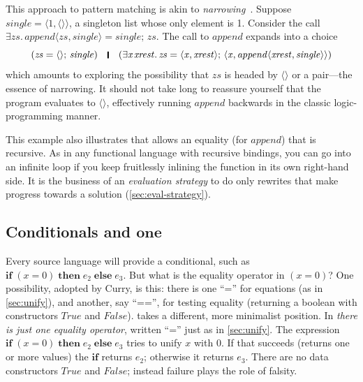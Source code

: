\documentclass[acmsmall,review,anonymous,dvipsnames]{acmart}
\newcommand{\Conid}[1]{\mathit{#1}}
\newcommand{\Varid}[1]{\mathit{#1}}
\begin{document}
This approach to pattern matching is akin to \emph{narrowing}~\cite{hanus:survey}.
Suppose \ensuremath{\Varid{single}\mathrel{=}\langle{}\mathrm{1},\langle\rangle\rangle}, a singleton list whose only element is 1.
Consider the call \ensuremath{\exists\Varid{zs}.\,\Varid{append}\langle\Varid{zs},\Varid{single}\rangle\mathrel{=}\Varid{single};\,\Varid{zs}}.
The call to \ensuremath{\Varid{append}} expands into a choice
$$
  \ensuremath{(\Varid{zs}\mathrel{=}\langle\rangle;\,\Varid{single})} \quad \ensuremath{\rule[-0.3mm]{0.5mm}{2.5mm}} \quad
  \ensuremath{(\exists\Varid{x}\hspace{0.3mm}\Varid{xrest}.\,\Varid{zs}\mathrel{=}\langle{}\Varid{x},\Varid{xrest}\rangle;\,\langle{}\Varid{x},\Varid{append}\langle\Varid{xrest},\Varid{single}\rangle\rangle)}
$$
which amounts to exploring the possibility that \ensuremath{\Varid{zs}} is headed by \ensuremath{\langle\rangle} or a pair---the
essence of narrowing.  It should not take long to reassure yourself that the program
evaluates to \ensuremath{\langle\rangle}, effectively running \ensuremath{\Varid{append}} backwards in the classic logic-programming manner.

This example also illustrates that \versecalc{} allows an equality (for \ensuremath{\Varid{append}})
that is recursive. As in any functional language with recursive bindings, you can
go into an infinite loop if you keep fruitlessly inlining the function in its own right-hand side.
It is the business of an \emph{evaluation strategy} to do only rewrites that make
progress towards a solution (\cref{sec:eval-strategy}).

\subsection{Conditionals and \ensuremath{\textbf{one}}} \label{sec:rigid} \label{sec:one} \label{sec:if}

Every source language will provide a conditional, such as \ensuremath{\textbf{if}\;(\Varid{x}\mathrel{=}\mathrm{0})\;\textbf{then}\;\Varid{e}_{\mathrm{2}}\;\textbf{else}\;\Varid{e}_{\mathrm{3}}}.  But what is the equality operator in \ensuremath{(\Varid{x}\mathrel{=}\mathrm{0})}?  One
possibility, adopted by Curry, is this: there is one ``='' for
equations (as in \cref{sec:unify}), and another, say ``=='', for
testing equality (returning a boolean with constructors \ensuremath{\Conid{True}} and \ensuremath{\Conid{False}}).  \versecalc{} takes a
different, more minimalist position. In \versecalc{} \emph{there is just one equality operator}, written ``='' just as in
\cref{sec:unify}. The expression \ensuremath{\textbf{if}\;(\Varid{x}\mathrel{=}\mathrm{0})\;\textbf{then}\;\Varid{e}_{\mathrm{2}}\;\textbf{else}\;\Varid{e}_{\mathrm{3}}} tries to unify \ensuremath{\Varid{x}} with \ensuremath{\mathrm{0}}.  If that succeeds (returns one or more values)
the \ensuremath{\textbf{if}} returns \ensuremath{\Varid{e}_{\mathrm{2}}}; otherwise it returns \ensuremath{\Varid{e}_{\mathrm{3}}}.  There are no data constructors \ensuremath{\Conid{True}} and \ensuremath{\Conid{False}}; instead
failure plays the role of falsity.
\end{document}
